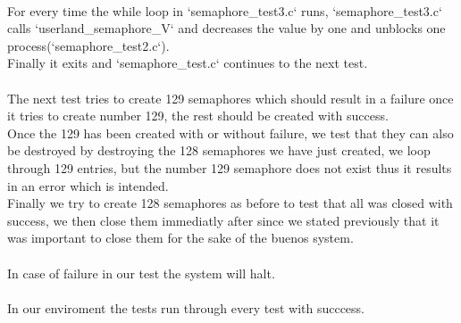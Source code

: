 \documentclass[a4paper,12pt,danish]{report}
\begin{document}
\\
For every time the while loop in `semaphore\_test3.c` runs, `semaphore\_test3.c` calls `userland\_semaphore\_V` and decreases the value by one and unblocks one process(`semaphore\_test2.c`).
\\
Finally it exits and `semaphore\_test.c` continues to the next test.
\\
\\
The next test tries to create 129 semaphores which should result in a failure once it tries to create number 129, the rest should be created with success.
\\
Once the 129 has been created with or without failure, we test that they can also be destroyed by destroying the 128 semaphores we have just created, we loop through 129 entries, but the number 129 semaphore does not exist thus it results in an error which is intended.
\\
Finally we try to create 128 semaphores as before to test that all was closed with success, we then close them immediatly after since we stated previously that it was important to close them for the sake of the buenos system.
\\
\\
In case of failure in our test the system will halt.
\\
\\
In our enviroment the tests run through every test with succcess.
\end{document}
